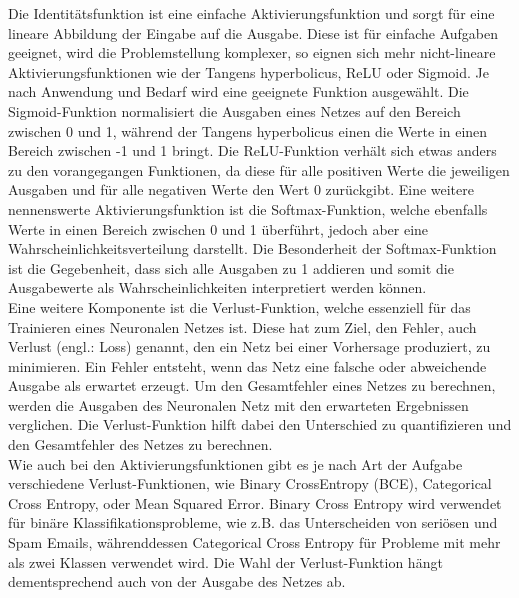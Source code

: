 Die Identitätsfunktion ist eine einfache Aktivierungsfunktion und sorgt für eine lineare Abbildung der Eingabe auf die Ausgabe. Diese ist für einfache Aufgaben geeignet, wird die Problemstellung komplexer, so eignen sich mehr nicht-lineare Aktivierungsfunktionen wie der Tangens hyperbolicus, \ac{ReLU} oder Sigmoid. Je nach Anwendung und Bedarf wird eine geeignete Funktion ausgewählt. Die Sigmoid-Funktion normalisiert die Ausgaben eines Netzes auf den Bereich zwischen 0 und 1, während der Tangens hyperbolicus einen die Werte in einen Bereich zwischen -1 und 1 bringt. Die \ac{ReLU}-Funktion verhält sich etwas anders zu den vorangegangen Funktionen, da diese für alle positiven Werte die jeweiligen Ausgaben und für alle negativen Werte den Wert 0 zurückgibt. Eine weitere nennenswerte Aktivierungsfunktion ist die Softmax-Funktion, welche ebenfalls Werte in einen Bereich zwischen 0 und 1 überführt, jedoch aber eine Wahrscheinlichkeitsverteilung darstellt. Die Besonderheit der Softmax-Funktion ist die Gegebenheit, dass sich alle Ausgaben zu 1 addieren und somit die Ausgabewerte als Wahrscheinlichkeiten interpretiert werden können.  \cite[vgl.][]{Frick2021} \\
Eine weitere Komponente ist die Verlust-Funktion, welche essenziell für das Trainieren eines Neuronalen Netzes ist. Diese hat zum Ziel, den Fehler, auch Verlust (engl.: Loss) genannt, den ein Netz bei einer Vorhersage produziert, zu minimieren. Ein Fehler entsteht, wenn das Netz eine falsche oder abweichende Ausgabe als erwartet erzeugt. Um den Gesamtfehler eines Netzes zu berechnen, werden die Ausgaben des Neuronalen Netz mit den erwarteten Ergebnissen verglichen. Die Verlust-Funktion hilft dabei den Unterschied zu quantifizieren und den Gesamtfehler des Netzes zu berechnen. \cite{Frick2021}\\
Wie auch bei den Aktivierungsfunktionen gibt es je nach Art der Aufgabe verschiedene Verlust-Funktionen, wie Binary CrossEntropy (BCE), Categorical Cross Entropy, oder Mean Squared Error. Binary Cross Entropy wird verwendet für binäre Klassifikationsprobleme, wie z.B. das Unterscheiden von seriösen und Spam Emails, währenddessen Categorical Cross Entropy für Probleme mit mehr als zwei Klassen verwendet wird. Die Wahl der Verlust-Funktion hängt dementsprechend auch von der Ausgabe des Netzes ab.   

